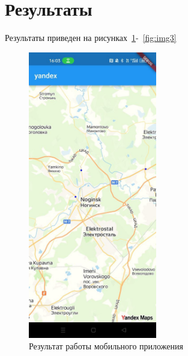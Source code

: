 \documentclass[a4paper, 14pt]{extarticle}
\begin{document}
\section{Результаты}

Результаты приведен на рисунках~\ref{fig:img1}-~\ref{fig:img3}

\begin{figure}[H]
\centering
\includegraphics[width=0.5\textwidth]{images/res1.jpg}
\caption{Результат работы мобильного приложения}
\label{fig:img1}
\end{figure}
\end{document}
